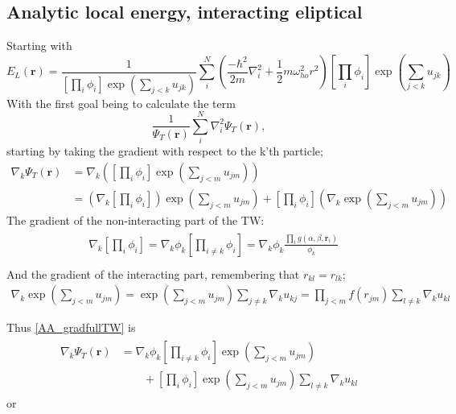 \documentclass[%
oneside,                 %
final,                   %
10pt]{article}
\begin{document}
\begin{appendices}
\subsection*{Analytic local energy, interacting eliptical} \label{APP_2:le_2}
Starting with
\begin{equation*}
    E_L(\mathbf{r}) =\frac{1}{ 
    \left[
    \prod_i \phi_i
\right]
\exp{\left(\sum_{j<k}u_{jk}\right)}
}  \sum_i^N \left(\frac{-\hbar^2}{2m}{\nabla }_{i}^2 +\frac{1}{2}m\omega_{ho}^2r^2 \right)  \left[
    \prod_i \phi_i
\right]
\exp{\left(\sum_{j<k}u_{jk}\right)}
 \end{equation*}
With the first goal being to calculate the term
\begin{equation*}
   \frac{1}{\Psi_T(\mathbf{r})}\sum_i^{N}\nabla_i^2\Psi_T(\mathbf{r}),
\end{equation*}
starting by taking the gradient with respect to the k'th particle;
\begin{align*}
  \nabla_k\Psi_T(\mathbf{r}) &= \nabla_k \left(\left[
    \prod_i \phi_i
\right]
\exp{\left(\sum_{j<m}u_{jm}\right)}\right) \\
 &= \left( \nabla_k \left[
    \prod_i \phi_i
\right] \right)
\exp{\left(\sum_{j<m} u_{jm}\right)} +
\left[
    \prod_i \phi_i
\right]
\left( \nabla_k \exp{\left(\sum_{j<m} u_{jm} \right)}\right) \label{AA_gradfullTW}
\end{align*}
The gradient of the non-interacting part of the TW:
\begin{align}
\begin{split}
& \nabla_k \left[
    \prod_i \phi_i
\right] =  \nabla_k \phi_k \left[
    \prod_{i\neq k} \phi_i
\right]= \nabla_k \phi_k \frac{\prod_i g(\alpha,\beta,\mathbf{r}_i)}{\phi_k} \\
\end{split}
\end{align}
And the gradient of the interacting part, remembering that $r_{kl}=r_{lk}$;
\begin{align}
\nabla_k \exp{\left(\sum_{j<m} u_{jm} \right)}
= \exp{\left(\sum_{j<m} u_{jm} \right)} \sum_{j\neq k} \nabla_k u_{kj}
=  \prod_{j<m} f(r_{jm}) \sum_{l\neq k} \nabla_k u_{kl}
\end{align}

Thus \eqref{AA_gradfullTW} is
\begin{align}
\begin{split}
  \nabla_k\Psi_T(\mathbf{r}) &= \nabla_k\phi_k\left[\prod_{i\ne k}\phi_i\right]\exp{\left(\sum_{j<m}u_{jm}\right)}
  \\
  &\qquad
  +  \left[\prod_i\phi_i\right]
  \exp{\left(\sum_{j<m}u_{jm}\right)}\sum_{l\ne k}\nabla_k u_{kl}
\end{split}
\end{align}
or


\end{appendices}
\end{document}
